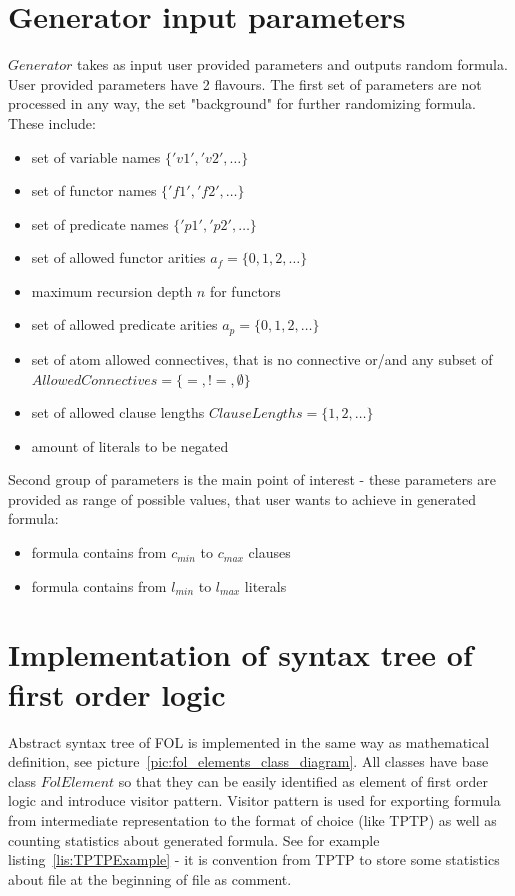 \section{Generator input parameters}
\label{sec:GeneratorParameters}

$Generator$ takes as input user provided parameters and outputs random formula. User provided parameters have 2 flavours. The first set of parameters are not processed in any way, the set "background" for further randomizing formula. These include:
\begin{itemize}
  \item set of variable names $\{'v1','v2',\dots\}$
  \item set of functor names $\{'f1','f2',\dots\}$
  \item set of predicate names $\{'p1','p2',\dots\}$
  \item set of allowed functor arities $a_f = \{0, 1, 2,\dots\}$
  \item maximum recursion depth $n$ for functors
  \item set of allowed predicate arities $a_p = \{0, 1, 2,\dots\}$
  \item set of atom allowed connectives, that is no connective or/and any subset of $AllowedConnectives = \{=, !=, \emptyset\}$
  \item set of allowed clause lengths $ClauseLengths = \{1,2,\dots\}$
  \item amount of literals to be negated
\end{itemize}

Second group of parameters is the main point of interest - these parameters are provided as range of possible values, that user wants to achieve in generated formula:
\begin{itemize}
  \item formula contains from $c_{min}$ to $c_{max}$ clauses
  \item formula contains from $l_{min}$ to $l_{max}$ literals
\end{itemize}

\section{Implementation of syntax tree of first order logic}
\label{sec:SyntaxTree}

Abstract syntax tree of \gls{FOL} is implemented in the same way as mathematical definition, see picture~\ref{pic:fol_elements_class_diagram}. All classes have base class $FolElement$ so that they can be easily identified as element of first order logic and introduce visitor pattern. Visitor pattern is used for exporting formula from intermediate representation to the format of choice (like \gls{TPTP}) as well as counting statistics about generated formula. See for example listing~\ref{lis:TPTPExample} - it is convention from TPTP to store some statistics about file at the beginning of file as comment.

